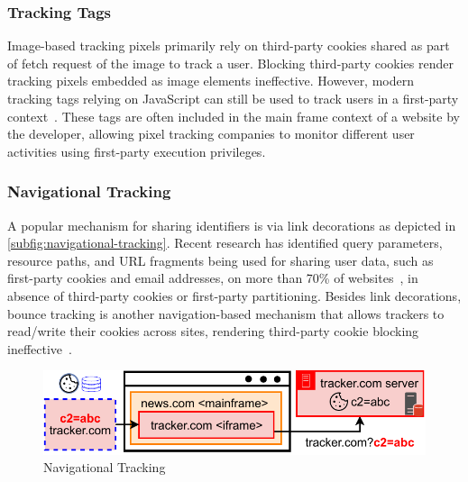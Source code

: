 \subsubsection{Tracking Tags}
Image-based tracking pixels primarily rely on third-party cookies shared as part of fetch request of the image to track a user.
%
Blocking third-party cookies render tracking pixels embedded as image elements ineffective. 
%
However, modern tracking tags relying on JavaScript can still be used to track users in a first-party context~\cite{munirCookieGraphUnderstandingDetecting2023}. 
%
These tags are often included in the main frame context of a website by the developer, allowing pixel tracking companies to monitor different user activities using first-party execution privileges.


\subsubsection{Navigational Tracking}
A popular mechanism for sharing identifiers is via link decorations as depicted in \autoref{subfig:navigational-tracking}. 
%
Recent research has identified query parameters, resource paths, and URL fragments being used for sharing user data, such as first-party cookies and email addresses, on more than 70\% of websites~\cite{munirPURLSafeEffective2024}, in absence of third-party cookies or first-party partitioning. 
%
Besides link decorations, bounce tracking is another navigation-based mechanism that allows trackers to read/write their cookies across sites, rendering third-party cookie blocking ineffective~\cite{kellyBounceTrackingMitigations2022}. 


\begin{figure}[htbp]
    \vspace{-2mm}
    \centering
    \includegraphics[width=1\linewidth]{figures/tracking-mechanisms-navigational-tracking.pdf}
    \caption{Navigational Tracking}
    \label{subfig:navigational-tracking}
    \vspace{-2mm}
\end{figure}

